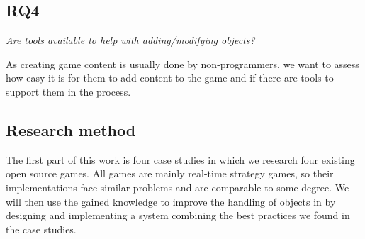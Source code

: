 \subsection{RQ4}
\textit{Are tools available to help with adding/modifying objects?}

As creating game content is usually done by non-programmers, we want to assess how easy it is for them to add content to
the game and if there are tools to support them in the process.

\subsection{Research method}
The first part of this work is four case studies in which we research four existing open source games. All games are
mainly real-time strategy games, so their implementations face similar problems and are comparable to some degree. We
will then use the gained knowledge to improve the handling of objects in \UH{} by designing and
implementing a system combining the best practices we found in the case studies. 
